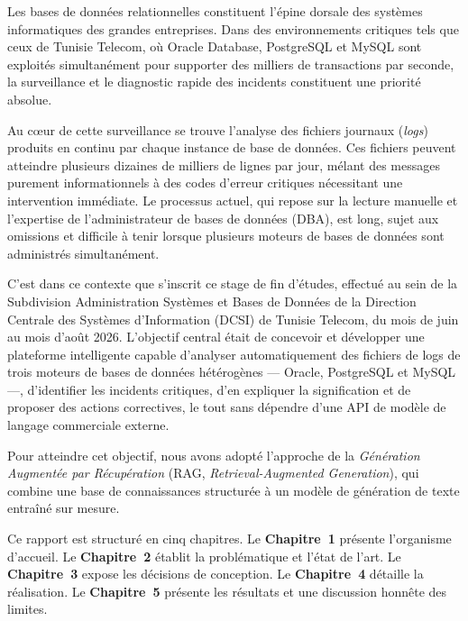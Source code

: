 \documentclass[12pt,a4paper]{report}
\begin{document}
Les bases de donn\'ees relationnelles constituent l'\'epine dorsale des syst\`emes
informatiques des grandes entreprises. Dans des environnements critiques tels que
ceux de Tunisie Telecom, o\`u Oracle Database, PostgreSQL et MySQL sont exploit\'es
simultan\'ement pour supporter des milliers de transactions par seconde, la
surveillance et le diagnostic rapide des incidents constituent une priorit\'e absolue.

Au c\oe{}ur de cette surveillance se trouve l'analyse des fichiers journaux
(\emph{logs}) produits en continu par chaque instance de base de donn\'ees. Ces
fichiers peuvent atteindre plusieurs dizaines de milliers de lignes par jour,
m\'elant des messages purement informationnels \`a des codes d'erreur critiques
n\'ecessitant une intervention imm\'ediate. Le processus actuel, qui repose sur la
lecture manuelle et l'expertise de l'administrateur de bases de donn\'ees (DBA),
est long, sujet aux omissions et difficile \`a tenir lorsque plusieurs moteurs de
bases de donn\'ees sont administr\'es simultan\'ement.

C'est dans ce contexte que s'inscrit ce stage de fin d'\'etudes, effectu\'e au sein
de la Subdivision Administration Syst\`emes et Bases de Donn\'ees de la Direction
Centrale des Syst\`emes d'Information (DCSI) de Tunisie Telecom, du mois de juin
au mois d'ao\^ut 2026. L'objectif central \'etait de concevoir et d\'evelopper une
plateforme intelligente capable d'analyser automatiquement des fichiers de logs de
trois moteurs de bases de donn\'ees h\'et\'erog\`enes --- Oracle, PostgreSQL et
MySQL ---, d'identifier les incidents critiques, d'en expliquer la signification et
de proposer des actions correctives, le tout sans d\'ependre d'une API de mod\`ele
de langage commerciale externe.

Pour atteindre cet objectif, nous avons adopt\'e l'approche de la
\emph{G\'en\'eration Augment\'ee par R\'ecup\'eration} (RAG,
\emph{Retrieval-Augmented Generation}), qui combine une base de connaissances
structur\'ee \`a un mod\`ele de g\'en\'eration de texte entra\^in\'e sur mesure.

Ce rapport est structur\'e en cinq chapitres. Le \textbf{Chapitre~1} pr\'esente
l'organisme d'accueil. Le \textbf{Chapitre~2} \'etablit la probl\'ematique et
l'\'etat de l'art. Le \textbf{Chapitre~3} expose les d\'ecisions de conception.
Le \textbf{Chapitre~4} d\'etaille la r\'ealisation. Le \textbf{Chapitre~5}
pr\'esente les r\'esultats et une discussion honn\^ete des limites.

\end{document}
